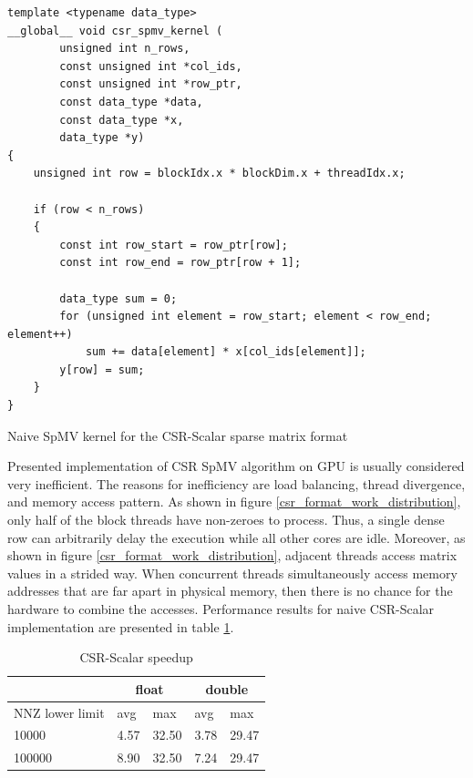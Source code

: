 \documentclass{article}
\begin{document}
\begin{listing}[H]
\begin{verbatim}
template <typename data_type>
__global__ void csr_spmv_kernel (
		unsigned int n_rows,
		const unsigned int *col_ids,
		const unsigned int *row_ptr,
		const data_type *data,
		const data_type *x,
		data_type *y)
{
	unsigned int row = blockIdx.x * blockDim.x + threadIdx.x;

	if (row < n_rows)
	{
		const int row_start = row_ptr[row];
		const int row_end = row_ptr[row + 1];

		data_type sum = 0;
		for (unsigned int element = row_start; element < row_end; element++)
			sum += data[element] * x[col_ids[element]];
		y[row] = sum;
	}
}
\end{verbatim}
\caption{Naive SpMV kernel for the CSR-Scalar sparse matrix format}
\label{csr_scalar}
\end{listing}

Presented implementation of CSR SpMV algorithm on GPU is usually considered very inefficient. The reasons for
inefficiency are load balancing, thread divergence, and memory access pattern. As shown in figure \ref{csr_format_work_distribution}, only half
of the block threads have non-zeroes to process. Thus, a single dense row can arbitrarily delay the execution while all
other cores are idle. Moreover, as shown in figure \ref{csr_format_work_distribution}, adjacent threads access matrix values in a strided way. When concurrent threads simultaneously 
access memory addresses that are far apart in physical memory, then there is no chance for the hardware to combine the accesses. Performance
results for naive CSR-Scalar implementation are presented in table \ref{csr_scalar_speedup_table}. 

\begin{table}[H]
	\centering
	\begin{tabular}{ |p{2.6cm}||p{1cm}|p{1cm}|p{1cm}|p{1cm}|  }
	 \hline
		& \multicolumn{2}{|c|}{float} & \multicolumn{2}{|c|}{double}\\
	 \hline
	 NNZ lower limit & avg & max & avg & max  \\
	 \hline
	 10000  & 4.57 & 32.50 & 3.78 & 29.47 \\
	 100000 & 8.90 & 32.50 & 7.24 & 29.47 \\
	 \hline
	\end{tabular}
	\caption{CSR-Scalar speedup}
  \label{csr_scalar_speedup_table}
\end{table}
\end{document}
